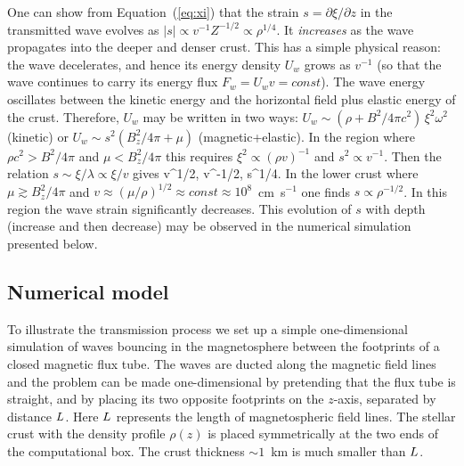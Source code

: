 One can show from Equation~(\ref{eq:xi}) that the strain $s=\partial\xi/\partial z$ in the transmitted wave evolves as $|s|\propto v^{-1}Z^{-1/2}\propto\rho^{1/4}$. It {\it increases} as the wave propagates into the deeper and denser crust. 
This has a simple physical reason: the wave decelerates, and hence its energy density $U_w$ grows as $v^{-1}$ 
(so that the wave continues to carry its energy flux $F_w=U_w v=const$). 
The wave energy oscillates between the kinetic energy and the horizontal field plus elastic energy of the crust. 
Therefore, $U_w$ may be written in two ways: $U_w\sim (\rho+B^2/4\pi c^2)\, \xi^2 \omega^2$ (kinetic) or $U_w\sim s^2 (B_z^2/4\pi+\mu)$ (magnetic+elastic). 
In the region where $\rho c^2>B^2/4\pi$ and $\mu<B_z^2/4\pi$ this requires $\xi^2\propto (\rho v)^{-1}$ and $s^2\propto v^{-1}$. 
Then the relation $s\sim \xi/\lambda\propto \xi/v$ gives 
\beq
 \xi\propto v^{1/2}, \qquad v\propto \rho^{-1/2}, \qquad  s\propto \rho^{1/4}.
\eeq 
In the lower crust where $\mu\gtrsim B_z^2/4\pi$ and $v\approx(\mu/\rho)^{1/2}\approx const \approx 10^8$~cm~s$^{-1}$ one finds $s\propto\rho^{-1/2}$. 
In this region the wave strain significantly decreases. 
This evolution of $s$ with depth (increase and then decrease) may be observed in the numerical simulation presented below.

\subsection{Numerical model}\label{sec:numerical}

To illustrate the transmission process we set up a simple one-dimensional simulation of waves bouncing in the magnetosphere between the footprints of a closed magnetic flux tube.
The \alfven waves are ducted along the magnetic field lines and the problem can be made one-dimensional by pretending that the flux tube is straight, and by placing its two opposite footprints on the $z$-axis, separated by distance $L$.
Here $L$ represents the length of magnetospheric field lines.
The stellar crust with the density profile $\rho(z)$ is placed symmetrically at the two ends of the computational box. 
The crust thickness $\sim 1$~km is much smaller than $L$.

